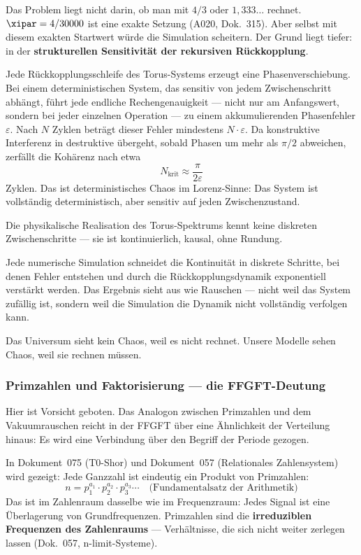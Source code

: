 Das Problem liegt nicht darin, ob man mit $4/3$ oder $1{,}333\ldots$ rechnet.
$\xipar = 4/30000$ ist eine exakte Setzung (A020, Dok.~315). Aber selbst mit
diesem exakten Startwert würde die Simulation scheitern. Der Grund liegt tiefer: in der \textbf{strukturellen
Sensitivität der rekursiven Rückkopplung}.

Jede Rückkopplungsschleife des Torus-Systems erzeugt eine Phasenverschiebung.
Bei einem deterministischen System, das sensitiv von jedem Zwischenschritt abhängt,
führt jede endliche Rechengenauigkeit — nicht nur am Anfangswert, sondern
bei jeder einzelnen Operation — zu einem akkumulierenden Phasenfehler $\varepsilon$.
Nach $N$ Zyklen beträgt dieser Fehler mindestens $N \cdot \varepsilon$.
Da konstruktive Interferenz in destruktive übergeht, sobald Phasen um mehr als
$\pi/2$ abweichen, zerfällt die Kohärenz nach etwa
\begin{equation}
    N_\text{krit} \approx \frac{\pi}{2\varepsilon}
\end{equation}
Zyklen. Das ist deterministisches Chaos im Lorenz-Sinne: Das System ist vollständig
deterministisch, aber sensitiv auf jeden Zwischenzustand.

\begin{keypoint}
Die physikalische Realisation des Torus-Spektrums kennt keine diskreten
Zwischenschritte — sie ist kontinuierlich, kausal, ohne Rundung.

Jede numerische Simulation schneidet die Kontinuität in diskrete Schritte,
bei denen Fehler entstehen und durch die Rückkopplungsdynamik exponentiell
verstärkt werden. Das Ergebnis sieht aus wie Rauschen — nicht weil das
System zufällig ist, sondern weil die Simulation die Dynamik nicht vollständig
verfolgen kann.

Das Universum sieht kein Chaos, weil es nicht rechnet.
Unsere Modelle sehen Chaos, weil sie rechnen müssen.
\end{keypoint}

\subsubsection*{Primzahlen und Faktorisierung — die FFGFT-Deutung}

Hier ist Vorsicht geboten. Das Analogon zwischen Primzahlen und dem Vakuumrauschen
reicht in der FFGFT über eine Ähnlichkeit der Verteilung hinaus: Es wird eine Verbindung
über den Begriff der Periode gezogen.

In Dokument~075 (T0-Shor) und Dokument~057 (Relationales Zahlensystem) wird gezeigt:
Jede Ganzzahl ist eindeutig ein Produkt von Primzahlen:
\begin{equation}
    n = p_1^{a_1} \cdot p_2^{a_2} \cdot p_3^{a_3} \cdots
    \quad \text{(Fundamentalsatz der Arithmetik)}
\end{equation}
Das ist im Zahlenraum dasselbe wie im Frequenzraum: Jedes Signal ist eine Überlagerung
von Grundfrequenzen. Primzahlen sind die \textbf{irreduziblen Frequenzen des Zahlenraums}
— Verhältnisse, die sich nicht weiter zerlegen lassen (Dok.~057, n-limit-Systeme).

